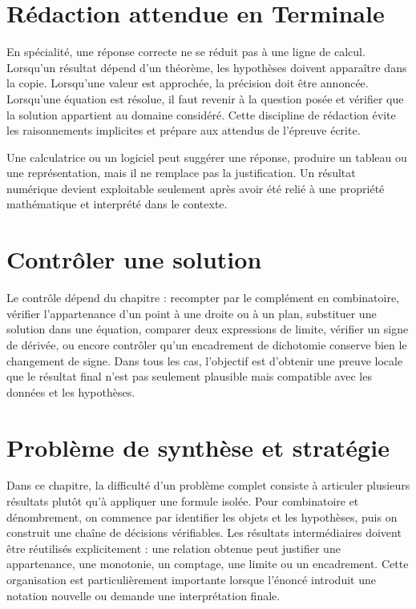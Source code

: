 \section{Rédaction attendue en Terminale}
En spécialité, une réponse correcte ne se réduit pas à une ligne de calcul. Lorsqu'un résultat dépend d'un théorème, les hypothèses doivent apparaître dans la copie. Lorsqu'une valeur est approchée, la précision doit être annoncée. Lorsqu'une équation est résolue, il faut revenir à la question posée et vérifier que la solution appartient au domaine considéré. Cette discipline de rédaction évite les raisonnements implicites et prépare aux attendus de l'épreuve écrite.

\begin{attention}
Une calculatrice ou un logiciel peut suggérer une réponse, produire un tableau ou une représentation, mais il ne remplace pas la justification. Un résultat numérique devient exploitable seulement après avoir été relié à une propriété mathématique et interprété dans le contexte.
\end{attention}

\section{Contrôler une solution}
Le contrôle dépend du chapitre : recompter par le complément en combinatoire, vérifier l'appartenance d'un point à une droite ou à un plan, substituer une solution dans une équation, comparer deux expressions de limite, vérifier un signe de dérivée, ou encore contrôler qu'un encadrement de dichotomie conserve bien le changement de signe. Dans tous les cas, l'objectif est d'obtenir une preuve locale que le résultat final n'est pas seulement plausible mais compatible avec les données et les hypothèses.

\section{Problème de synthèse et stratégie}

Dans ce chapitre, la difficulté d'un problème complet consiste à articuler plusieurs résultats plutôt qu'à appliquer une formule isolée. Pour combinatoire et dénombrement, on commence par identifier les objets et les hypothèses, puis on construit une chaîne de décisions vérifiables. Les résultats intermédiaires doivent être réutilisés explicitement : une relation obtenue peut justifier une appartenance, une monotonie, un comptage, une limite ou un encadrement. Cette organisation est particulièrement importante lorsque l'énoncé introduit une notation nouvelle ou demande une interprétation finale.


